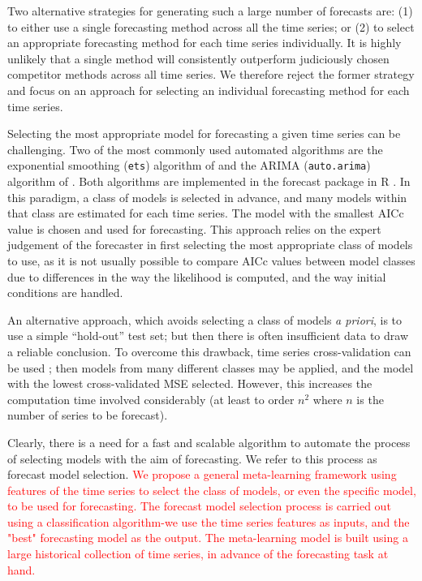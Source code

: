 \documentclass[11pt,a4paper,]{article}
\begin{document}
Two alternative strategies for generating such a large number of forecasts are: (1) to either use a single forecasting method across all the time series; or (2) to select an appropriate forecasting method for each time series individually. It is highly unlikely that a single method will consistently outperform judiciously chosen competitor methods across all time series. We therefore reject the former strategy and focus on an approach for selecting an individual forecasting method for each time series.

Selecting the most appropriate model for forecasting a given time series can be challenging. Two of the most commonly used automated algorithms are the exponential smoothing (\texttt{ets}) algorithm of \textcite{Hyndman2002} and the ARIMA (\texttt{auto.arima}) algorithm of \textcite{Hyndman2008}. Both algorithms are implemented in the forecast package in R \autocites{Rcore}{forecast}. In this paradigm, a class of models is selected in advance, and many models within that class are estimated for each time series. The model with the smallest AICc value is chosen and used for forecasting. This approach relies on the expert judgement of the forecaster in first selecting the most appropriate class of models to use, as it is not usually possible to compare AICc values between model classes due to differences in the way the likelihood is computed, and the way initial conditions are handled.

An alternative approach, which avoids selecting a class of models \emph{a priori}, is to use a simple ``hold-out'' test set; but then there is often insufficient data to draw a reliable conclusion. To overcome this drawback, time series cross-validation can be used \autocites{racine2000consistent}{hyndman2014forecasting}; then models from many different classes may be applied, and the model with the lowest cross-validated MSE selected. However, this increases the computation time involved considerably (at least to order \(n^2\) where \(n\) is the number of series to be forecast).

Clearly, there is a need for a fast and scalable algorithm to automate the process of selecting models with the aim of forecasting. We refer to this process as forecast model selection. \textcolor{red}{We propose a general meta-learning framework using features of the time series to select the class of models, or even the specific model, to be used for forecasting. The forecast model selection process
is carried out using a classification algorithm-we use the time series features as inputs, and the "best" 
forecasting model as the output. The meta-learning model is built using a large historical collection of time series, in advance of the forecasting task at hand.}
\end{document}
